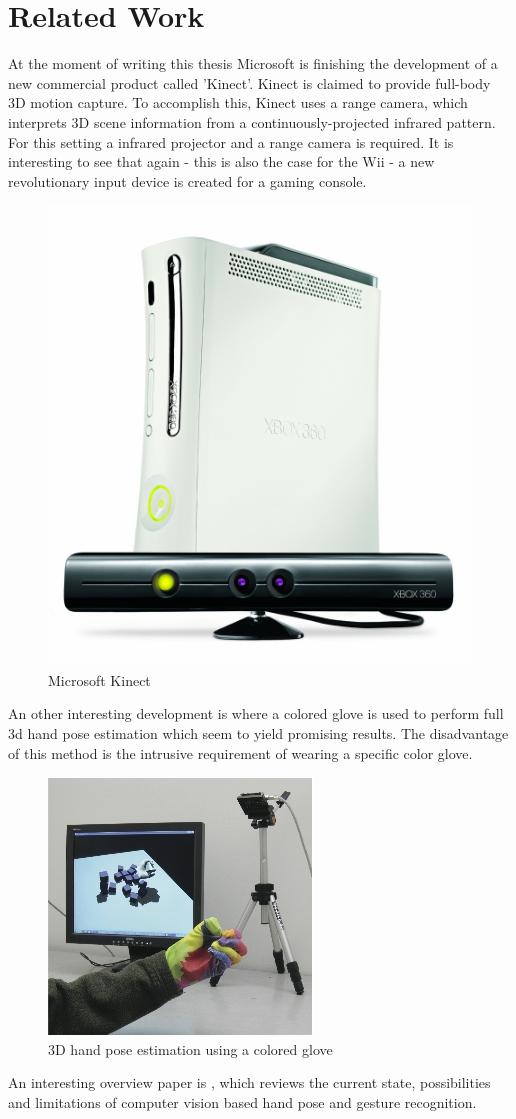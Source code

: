\section{Related Work}
At the moment of writing this thesis Microsoft is finishing the development of a new commercial product called 'Kinect'. Kinect is claimed to provide full-body 3D motion capture. To accomplish this, Kinect uses a range camera, which interprets 3D scene information from a continuously-projected infrared pattern. For this setting a infrared projector and a range camera is required. It is interesting to see that again - this is also the case for the Wii - a new revolutionary input device is created for a gaming console. 

\begin{figure}[htbp]
	\center{}
	\label{fig:kinect}
	\includegraphics[width=0.3\linewidth]{figures/wave.jpg}
	\caption{Microsoft Kinect}
\end{figure}


An other interesting development is \cite{Wang2009} where a colored glove is used to perform full 3d hand pose estimation which seem to yield promising results. The disadvantage of this method is the intrusive requirement of wearing a specific color glove. 

\begin{figure}[htbp]
	\center{}
	\label{fig:wang2009}
	\includegraphics[width=0.3\linewidth]{figures/wang2009.jpg}
	\caption{3D hand pose estimation using a colored glove}
\end{figure}

An interesting overview paper is \cite{Erol2007}, which reviews the current state, possibilities and limitations of computer vision based hand pose and gesture recognition.


